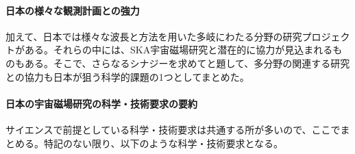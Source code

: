 \paragraph{日本の様々な観測計画との強力}

加えて、日本では様々な波長と方法を用いた多岐にわたる分野の研究プロジェクトがある。それらの中には、SKA宇宙磁場研究と潜在的に協力が見込まれるものもある。そこで、さらなるシナジーを求めてと題して、多分野の関連する研究との協力も日本が狙う科学的課題の1つとしてまとめた。

\paragraph{日本の宇宙磁場研究の科学・技術要求の要約}

サイエンスで前提としている科学・技術要求は共通する所が多いので、ここでまとめる。特記のない限り、以下のような科学・技術要求となる。
